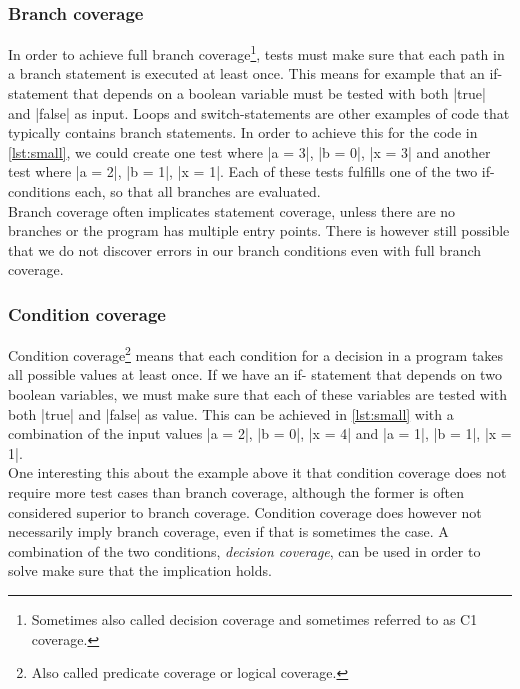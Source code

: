\subsubsection{Branch coverage}

In order to achieve full branch coverage\footnote{Sometimes also called
decision coverage and sometimes referred to as C1 coverage.}, tests must
make sure that each path in a branch statement is executed at least
once. This means for example that an if-statement that depends on a
boolean variable must be tested with both |true| and |false| as input.
Loops and switch-statements are other examples of code that typically
contains branch statements. In order to achieve this for the code in
\ref{lst:small}, we could create one test where |a = 3|, |b = 0|,
|x = 3| and another test where |a = 2|, |b = 1|, |x = 1|. Each of these
tests fulfills one of the two if-conditions each, so that all branches
are evaluated.\\

Branch coverage often implicates statement coverage, unless there are no
branches or the program has multiple entry points. There is however
still possible that we do not discover errors in our branch conditions
even with full branch coverage.\\


\subsubsection{Condition coverage}

Condition coverage\footnote{Also called predicate coverage or logical
coverage.} means that each condition for a decision in a program takes
all possible values at least once. If we have an if- statement that
depends on two boolean variables, we must make sure that each of these
variables are tested with both |true| and |false| as value. This can be
achieved in \ref{lst:small} with a combination of the input values
|a = 2|, |b = 0|, |x = 4| and |a = 1|, |b = 1|, |x = 1|.\\

One interesting this about the example above it that condition coverage
does not require more test cases than branch coverage, although the
former is often considered superior to branch coverage. Condition
coverage does however not necessarily imply branch coverage, even if
that is sometimes the case. A combination of the two conditions,
\emph{decision coverage}, can be used in order to solve make sure that
the implication holds.\\


